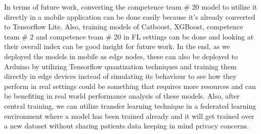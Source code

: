 In terms of future work, converting the competence team \# 20 model to utilize it directly in a mobile application can be done easily because it's already converted to Tensorflow Lite. Also, training models of Catboost, XGBoost, competence team \# 2 and competence team \# 20 in FL settings can be done and looking at their overall index can be good insight for future work. In the end, as we deployed the models in mobile as edge nodes, these can also be deployed to Arduino by utilizing Tensorflow quantization techniques and training them directly in edge devices instead of simulating its behaviour to see how they perform in real settings could be something that requires more resources and can be benefiting in real world performance analysis of these models. Also, after central training, we can utilize transfer learning technique in a federated learning environment where a model has been trained already and it will get trained over a new dataset without sharing patients data keeping in mind privacy concerns.  

